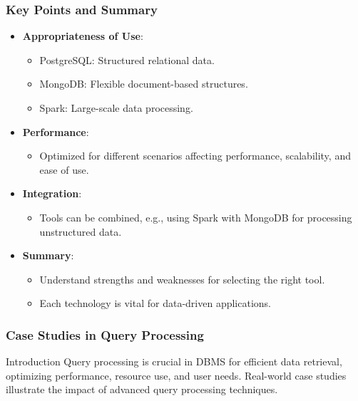 \documentclass[aspectratio=169]{beamer}
\begin{document}
\begin{frame}[fragile]
    \frametitle{Key Points and Summary}
    \begin{itemize}
        \item \textbf{Appropriateness of Use}:
        \begin{itemize}
            \item PostgreSQL: Structured relational data.
            \item MongoDB: Flexible document-based structures.
            \item Spark: Large-scale data processing.
        \end{itemize}
        \item \textbf{Performance}:
        \begin{itemize}
            \item Optimized for different scenarios affecting performance, scalability, and ease of use.
        \end{itemize}
        \item \textbf{Integration}:
        \begin{itemize}
            \item Tools can be combined, e.g., using Spark with MongoDB for processing unstructured data.
        \end{itemize}
        \item \textbf{Summary}:
        \begin{itemize}
            \item Understand strengths and weaknesses for selecting the right tool.
            \item Each technology is vital for data-driven applications.
        \end{itemize}
    \end{itemize}
\end{frame}

\begin{frame}
    \frametitle{Case Studies in Query Processing}
    \begin{block}{Introduction}
        Query processing is crucial in DBMS for efficient data retrieval, optimizing performance, resource use, and user needs. Real-world case studies illustrate the impact of advanced query processing techniques.
    \end{block}
\end{frame}
\end{document}

